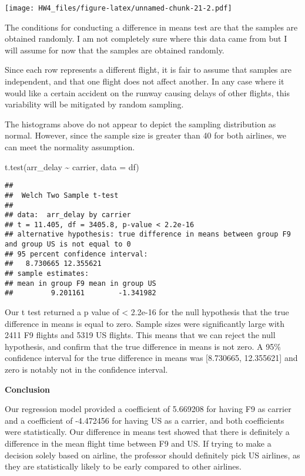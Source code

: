 \documentclass[
]{article}
\newenvironment{Shaded}{\begin{snugshade}}{\end{snugshade}}
\newcommand{\AttributeTok}[1]{\textcolor[rgb]{0.77,0.63,0.00}{#1}}
\newcommand{\FunctionTok}[1]{\textcolor[rgb]{0.00,0.00,0.00}{#1}}
\newcommand{\NormalTok}[1]{#1}
\newcommand{\SpecialCharTok}[1]{\textcolor[rgb]{0.00,0.00,0.00}{#1}}
\begin{document}
\texttt{[image: HW4\_files/figure-latex/unnamed-chunk-21-2.pdf]}

The conditions for conducting a difference in means test are that the
samples are obtained randomly. I am not completely sure where this data
came from but I will assume for now that the samples are obtained
randomly.

Since each row represents a different flight, it is fair to assume that
samples are independent, and that one flight does not affect another. In
any case where it would like a certain accident on the runway causing
delays of other flights, this variability will be mitigated by random
sampling.

The histograms above do not appear to depict the sampling distribution
as normal. However, since the sample size is greater than 40 for both
airlines, we can meet the normality assumption.

\begin{Shaded}
\begin{Highlighting}[]
\FunctionTok{t.test}\NormalTok{(arr\_delay }\SpecialCharTok{\textasciitilde{}}\NormalTok{ carrier, }\AttributeTok{data =}\NormalTok{ df)}
\end{Highlighting}
\end{Shaded}

\begin{verbatim}
## 
##  Welch Two Sample t-test
## 
## data:  arr_delay by carrier
## t = 11.405, df = 3405.8, p-value < 2.2e-16
## alternative hypothesis: true difference in means between group F9 and group US is not equal to 0
## 95 percent confidence interval:
##   8.730665 12.355621
## sample estimates:
## mean in group F9 mean in group US 
##         9.201161        -1.341982
\end{verbatim}

Our t test returned a p value of \textless{} 2.2e-16 for the null
hypothesis that the true difference in means is equal to zero. Sample
sizes were significantly large with 2411 F9 flights and 5319 US flights.
This means that we can reject the null hypothesis, and confirm that the
true difference in means is not zero. A 95\% confidence interval for the
true difference in means was {[}8.730665, 12.355621{]} and zero is
notably not in the confidence interval.

\textbf{Conclusion}

Our regression model provided a coefficient of 5.669208 for having F9 as
carrier and a coefficient of -4.472456 for having US as a carrier, and
both coefficients were statistically. Our difference in means test
showed that there is definitely a difference in the mean flight time
between F9 and US. If trying to make a decision solely based on airline,
the professor should definitely pick US airlines, as they are
statistically likely to be early compared to other airlines.
\end{document}
